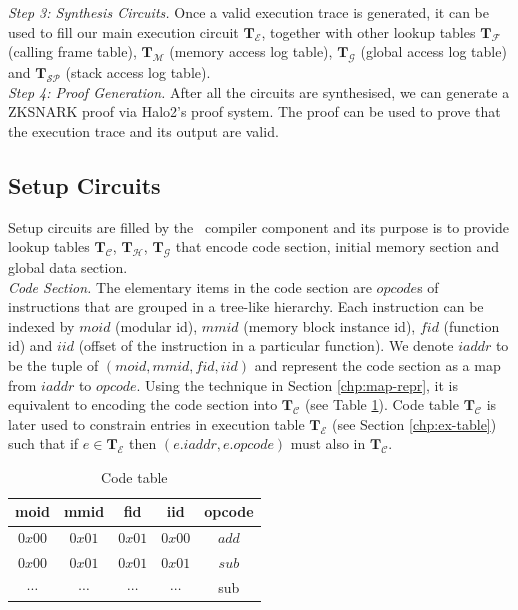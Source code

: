 \smallskip\noindent\emph{Step 3: Synthesis Circuits.}
Once a valid execution trace is generated, it can be used to fill our main execution circuit $\mathbf{T}_\mathcal{E}$, together with other lookup tables $\mathbf{T}_\mathcal{F}$ (calling frame table), $\mathbf{T}_\mathcal{M}$ (memory access log table), $\mathbf{T}_\mathcal{G}$ (global access log table) and $\mathbf{T}_{\mathcal{SP}}$ (stack access log table). \\

\noindent\emph{Step 4: Proof Generation.}
After all the circuits are synthesised, we can generate a ZKSNARK proof via Halo2's proof system. The proof can be used to prove that the execution trace and its output are valid.

\subsection{Setup Circuits}
Setup circuits are filled by the \zkwasm\, compiler component and its purpose is to provide lookup tables $\mathbf{T}_\mathcal{C}$, $\mathbf{T}_\mathcal{H}$, $\mathbf{T}_\mathcal{G}$ that encode code section, initial memory section and global data section.\\

\noindent\emph{Code Section.}
The elementary items in the code section are $opcode$s of instructions that are grouped in a tree-like hierarchy. Each instruction can be indexed by $moid$ (modular id), $mmid$ (memory block instance id), $fid$ (function id) and $iid$ (offset of the instruction in a particular function). We denote $iaddr$ to be the tuple of $(moid, mmid, fid, iid)$ and represent the code section as a map from $iaddr$ to $opcode$. Using the technique in Section \ref{chp:map-repr}, it is equivalent to encoding the code section into $\mathbf{T}_\mathcal{C}$ (see Table \ref{tbl:code-table}). Code table $\mathbf{T}_\mathcal{C}$ is later used to constrain entries in execution table $\mathbf{T}_\mathcal{E}$ (see Section \ref{chp:ex-table}) such that if $e \in \mathbf{T}_\mathcal{E}$ then $(e.iaddr, e.opcode)$ must also in $\mathbf{T}_\mathcal{C}$. 

\begin{table}[!h]
\begin{center}
\caption{Code table}
\label{tbl:code-table}
\begin{tabular}{ | c | c | c | c | c | }
  \hline
  moid & mmid & fid & iid & opcode \\
  \hline
  $0x00$ & $0x01$ & $0x01$ & $0x00$ & $add$ \\
  \hline
  $0x00$ & $0x01$ & $0x01$ & $0x01$ & $sub$ \\ 
  \hline
  $\cdots$ & $\cdots$ & $\cdots$ & $\cdots$ & sub \\ 
  \hline
\end{tabular}

\end{center}
\end{table}

